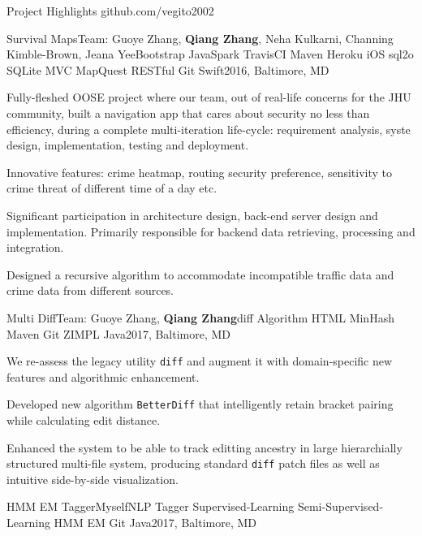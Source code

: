 \documentclass{resume} %
\begin{document}
\begin{rSection}{Project Highlights \faGithub\hspace{0.1cm} github.com/vegito2002}

\begin{rSubsection}{Survival Maps}{Team: Guoye Zhang, {\bf Qiang Zhang}, Neha Kulkarni, Channing Kimble-Brown, Jeana Yee}{Bootstrap JavaSpark TravisCI Maven Heroku iOS sql2o SQLite MVC MapQuest RESTful Git Swift}{2016, Baltimore, MD}
\item Fully-fleshed OOSE project where our team, out of real-life concerns for the JHU community, built a navigation app that cares about security no less than efficiency, during a complete multi-iteration life-cycle: requirement analysis, syste design, implementation, testing and deployment.
\item Innovative features: crime heatmap, routing security preference, sensitivity to crime threat of different time of a day etc.
\item Significant participation in architecture design, back-end server design and implementation. Primarily responsible for backend data retrieving, processing and integration.
\item Designed a recursive algorithm to accommodate incompatible traffic data and crime data from different sources.
\end{rSubsection}
\begin{rSubsection}{Multi Diff}{Team: Guoye Zhang, {\bf Qiang Zhang}}{diff Algorithm HTML MinHash Maven Git ZIMPL Java}{2017, Baltimore, MD}
\item We re-assess the legacy utility \texttt{diff} and augment it with domain-specific new features and algorithmic enhancement.
\item Developed new algorithm \texttt{BetterDiff} that intelligently retain bracket pairing while calculating edit distance.
\item Enhanced the system to be able to track editting ancestry in large hierarchially structured multi-file system, producing standard \texttt{diff} patch files as well as intuitive side-by-side visualization.
\end{rSubsection}
\begin{rSubsection}{HMM EM Tagger}{Myself}{NLP Tagger Supervised-Learning Semi-Supervised-Learning HMM EM Git Java}{2017, Baltimore, MD}

\end{rSubsection}
\end{rSection}
\end{document}
